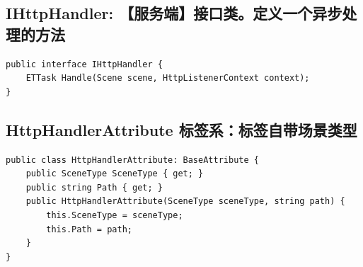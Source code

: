 \documentclass[9pt, b5paper]{article}
\begin{document}
\subsection{IHttpHandler: 【服务端】接口类。定义一个异步处理的方法}
\label{sec-7-20}
\begin{verbatim}
public interface IHttpHandler {
    ETTask Handle(Scene scene, HttpListenerContext context);
}
\end{verbatim}
\subsection{HttpHandlerAttribute 标签系：标签自带场景类型}
\label{sec-7-21}
\begin{verbatim}
public class HttpHandlerAttribute: BaseAttribute {
    public SceneType SceneType { get; }
    public string Path { get; }
    public HttpHandlerAttribute(SceneType sceneType, string path) {
        this.SceneType = sceneType;
        this.Path = path;
    }
}
\end{verbatim}
\end{document}
